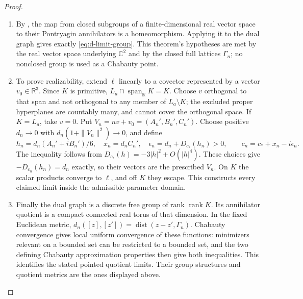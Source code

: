 \begin{proof}
\begin{enumerate}[label=\arabic*.,leftmargin=*]
\item By \cite[Theorem~3.1, p.~2017]{Cornulier2011}, the map from
closed subgroups of a finite-dimensional real vector space to their
Pontryagin annihilators is a homeomorphism. Applying it to the dual graph gives exactly
\eqref{eq:d-limit-group}. This theorem's hypotheses are met by the
real vector space underlying \(\mathbb C^2\) and by the closed full
lattices \(\Gamma_n\); no nonclosed group is used as a Chabauty
point.

\item To prove realizability, extend \(\ell\) linearly to a covector
represented by a vector \(v_0\in\mathbb R^3\). Since \(K\) is
primitive, \(L_a\cap\operatorname{span}_{\mathbb R}K=K\).
Choose \(v\) orthogonal to that span and not orthogonal to any member
of \(L_a\setminus K\); the excluded proper hyperplanes are
countably many, and cannot cover the orthogonal space. If
\(K=L_a\), take \(v=0\). Put \(V_n=nv+v_0=(A_n',B_n',C_n')\).
Choose positive \(d_n\to0\) with
\(d_n(1+\|V_n\|^2)\to0\), and define
\[
 h_n=d_n(A_n'+iB_n')/6,\quad x_n=d_nC_n',\quad
 \epsilon_n=d_n+D_{c_*}(h_n)>0,
 \qquad c_n=c_*+x_n-i\epsilon_n.
\]
The inequality follows from \(D_{c_*}(h)=-3|h|^2+O(|h|^4)\).
These choices give \(-D_{c_n}(h_n)=d_n\) exactly, so their vectors
are the prescribed \(V_n\). On \(K\) the scalar products converge
to \(\ell\), and off \(K\) they escape. This constructs every
claimed limit inside the admissible parameter domain.

\item Finally the dual graph is a discrete free group of rank
\(\operatorname{rank}K\). Its annihilator quotient is a compact
connected real torus of that dimension. In the fixed Euclidean metric,
\(d_n([z],[z'])=\operatorname{dist}(z-z',\Gamma_n)\).
Chabauty convergence gives local uniform convergence of these
functions: minimizers relevant on a bounded set can be restricted to
a bounded set, and the two defining Chabauty approximation properties
then give both inequalities. This identifies the stated pointed
quotient limits. Their group structures and quotient metrics are the ones displayed above.
\end{enumerate}
\end{proof}